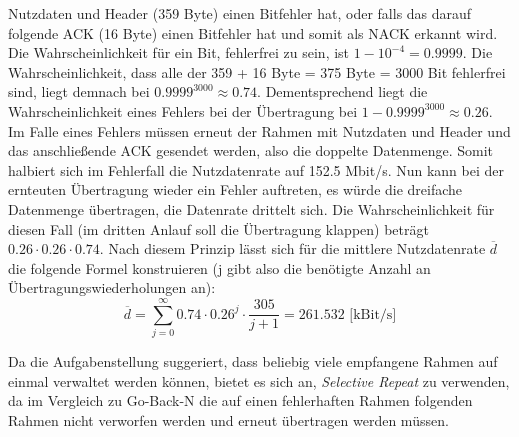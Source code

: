 \documentclass{../exercisesheet}
\begin{document}
\begin{exercise}{4}
\begin{subexercise}
	Nutzdaten und Header (359 Byte) einen Bitfehler hat, oder falls das darauf folgende ACK (16 Byte) einen Bitfehler hat und somit als NACK erkannt wird. Die Wahrscheinlichkeit
	für ein Bit, fehlerfrei zu sein, ist $1-10^{-4}=0.9999$. Die Wahrscheinlichkeit, dass alle der 359 + 16 Byte = 375 Byte = 3000 Bit fehlerfrei sind, liegt demnach bei
	$0.9999^{3000}\approx 0.74$. Dementsprechend liegt die Wahrscheinlichkeit eines Fehlers bei der Übertragung bei $1-0.9999^{3000}\approx 0.26$. Im Falle eines Fehlers
	müssen erneut der Rahmen mit Nutzdaten und Header und das anschließende ACK gesendet werden, also die doppelte Datenmenge. Somit halbiert sich im Fehlerfall
	die Nutzdatenrate auf 152.5 Mbit/s. Nun kann bei der ernteuten Übertragung wieder ein Fehler auftreten, es würde die dreifache Datenmenge übertragen, die Datenrate drittelt sich.
	Die Wahrscheinlichkeit für diesen Fall (im dritten Anlauf soll die Übertragung klappen) beträgt $0.26 \cdot 0.26 \cdot 0.74$. Nach diesem Prinzip lässt sich für die mittlere
	Nutzdatenrate $\overline{d}$ die folgende Formel konstruieren (j gibt also die benötigte Anzahl an Übertragungswiederholungen an):
	\[
	\overline{d} =\sum_{j=0}^{\infty}0.74 \cdot 0.26^j \cdot \frac{305}{j+1} = 261.532 \text{ [kBit/s]}
	\]
\end{subexercise}
\begin{subexercise}
	Da die Aufgabenstellung suggeriert, dass beliebig viele empfangene Rahmen auf einmal verwaltet werden können, bietet es sich an, \textit{Selective Repeat} zu verwenden,
	da im Vergleich zu Go-Back-N die auf einen fehlerhaften Rahmen folgenden Rahmen nicht verworfen werden und erneut übertragen werden müssen.
\end{subexercise}
\end{exercise}
\end{document}
